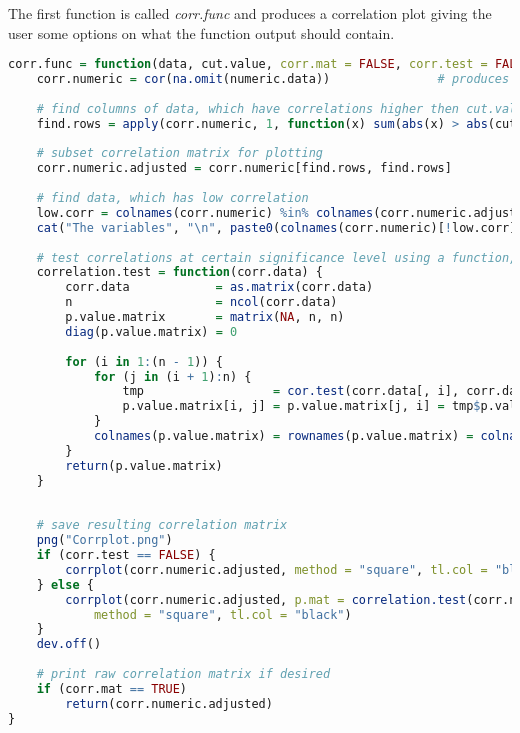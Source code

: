 The first function is called \textit{corr.func} and produces a correlation  plot giving the user some options on what the function output should contain.
\begin{lstlisting}[language=R]
corr.func = function(data, cut.value, corr.mat = FALSE, corr.test = FALSE, significance = 0.05) {
    corr.numeric = cor(na.omit(numeric.data))               # produces correlation matrix of all numeric variables in the dataset
    
    # find columns of data, which have correlations higher then cut.value
    find.rows = apply(corr.numeric, 1, function(x) sum(abs(x) > abs(cut.value)) > 1)
    
    # subset correlation matrix for plotting
    corr.numeric.adjusted = corr.numeric[find.rows, find.rows]
    
    # find data, which has low correlation
    low.corr = colnames(corr.numeric) %in% colnames(corr.numeric.adjusted)
    cat("The variables", "\n", paste0(colnames(corr.numeric)[!low.corr], collapse = ", "), "\n", "have very low bivariate correlations with the other numeric variables in the training data set!")
    
    # test correlations at certain significance level using a function, that produces a p-value matrix for all bivariate correlations
    correlation.test = function(corr.data) {
        corr.data            = as.matrix(corr.data)
        n                    = ncol(corr.data)
        p.value.matrix       = matrix(NA, n, n)
        diag(p.value.matrix) = 0
        
        for (i in 1:(n - 1)) {
            for (j in (i + 1):n) {
                tmp                  = cor.test(corr.data[, i], corr.data[, j]) # testing correlation
                p.value.matrix[i, j] = p.value.matrix[j, i] = tmp$p.value       # filling p-value matrix with respective p-values
            }
            colnames(p.value.matrix) = rownames(p.value.matrix) = colnames(corr.numeric.adjusted)
        }
        return(p.value.matrix)
    }
    
    
    # save resulting correlation matrix
    png("Corrplot.png")
    if (corr.test == FALSE) {
        corrplot(corr.numeric.adjusted, method = "square", tl.col = "black")
    } else {
        corrplot(corr.numeric.adjusted, p.mat = correlation.test(corr.numeric.adjusted), sig.level = significance, 
            method = "square", tl.col = "black")
    }
    dev.off()
    
    # print raw correlation matrix if desired
    if (corr.mat == TRUE) 
        return(corr.numeric.adjusted)
}
\end{lstlisting}
